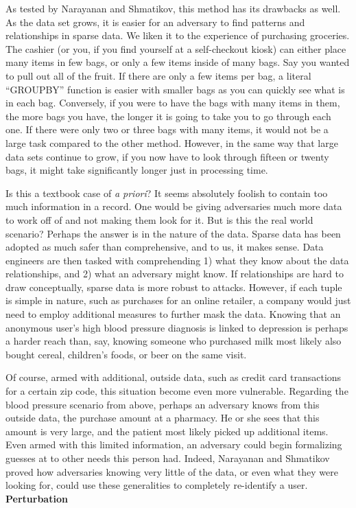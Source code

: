 \documentclass[10pt,journal,compsoc]{IEEEtran}
\begin{document}
	As tested by Narayanan and Shmatikov, this method has its drawbacks as well.  As the data set grows, it is easier for an adversary to find patterns and relationships in sparse data.  We liken it to the experience of purchasing groceries.  The cashier (or you, if you find yourself at a self-checkout kiosk) can either place many items in few bags, or only a few items inside of many bags.  Say you wanted to pull out all of the fruit.  If there are only a few items per bag, a literal “GROUPBY” function is easier with smaller bags as you can quickly see what is in each bag.  Conversely, if you were to have the bags with many items in them, the more bags you have, the longer it is going to take you to go through each one.  If there were only two or three bags with many items, it would not be a large task compared to the other method.  However, in the same way that large data sets continue to grow, if you now have to look through fifteen or twenty bags, it might take significantly longer just in processing time.
	
	Is this a textbook case of \textit{a priori}?  It seems absolutely foolish to contain too much information in a record.  One would be giving adversaries much more data to work off of and not making them look for it. But is this the real world scenario? Perhaps the answer is in the nature of the data.  Sparse data has been adopted as much safer than comprehensive, and to us, it makes sense.  Data engineers are then tasked with comprehending 1) what they know about the data relationships, and 2) what an adversary might know.  If relationships are hard to draw conceptually, sparse data is more robust to attacks.  However, if each tuple is simple in nature, such as purchases for an online retailer, a company would just need to employ additional measures to further mask the data.  Knowing that an anonymous user’s high blood pressure diagnosis is linked to depression is perhaps a harder reach than, say, knowing someone who purchased milk most likely also bought cereal, children’s foods, or beer on the same visit.
	  
	Of course, armed with additional, outside data, such as credit card transactions for a certain zip code, this situation become even more vulnerable.  Regarding the blood pressure scenario from above, perhaps an adversary knows from this outside data, the purchase amount at a pharmacy.  He or she sees that this amount is very large, and the patient most likely picked up additional items.  Even armed with this limited information, an adversary could begin formalizing guesses at to other needs this person had.  Indeed, Narayanan and Shmatikov proved how adversaries knowing very little of the data, or even what they were looking for, could use these generalities to completely re-identify a user\cite{narayanan}.
\linebreak	
\noindent \textbf{Perturbation}
\end{document}
